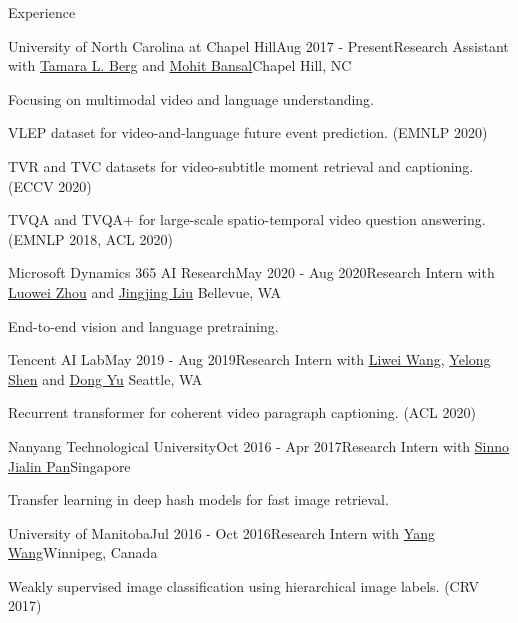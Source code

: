 \documentclass{resume} %
\begin{document}
\begin{rSection}{Experience}

\begin{rSubsection}{University of North Carolina at Chapel Hill}{Aug 2017 - Present}{Research Assistant with \href{http://www.tamaraberg.com/}{Tamara L. Berg} and \href{http://www.cs.unc.edu/~mbansal/}{Mohit Bansal}}{Chapel Hill, NC}
\item Focusing on multimodal video and language understanding.
\item VLEP dataset for video-and-language future event prediction. (EMNLP 2020)
\item TVR and TVC datasets for video-subtitle moment retrieval and captioning. (ECCV 2020)
\item TVQA and TVQA+ for large-scale spatio-temporal video question answering. (EMNLP 2018, ACL 2020)
\end{rSubsection}



\begin{rSubsection}{Microsoft Dynamics 365 AI Research}{May 2020 - Aug 2020}{Research Intern with 
    \href{https://luoweizhou.github.io/}{Luowei Zhou} and
    \href{https://www.linkedin.com/in/jingjing-liu-65703431/}{Jingjing Liu}} {Bellevue, WA}
    \item End-to-end vision and language pretraining.
    \end{rSubsection}



\begin{rSubsection}{Tencent AI Lab}{May 2019 - Aug 2019}{Research Intern with 
    \href{http://www.deepcv.net/}{Liwei Wang}, 
    \href{https://scholar.google.com/citations?hl=en&user=S6OFEFEAAAAJ}{Yelong Shen} 
    and \href{https://scholar.google.com/citations?user=tMY31_gAAAAJ&hl=en}{Dong Yu}} {Seattle, WA}
    \item Recurrent transformer for coherent video paragraph captioning. (ACL 2020)
    \end{rSubsection}


\begin{rSubsection}{Nanyang Technological University}{Oct 2016 - Apr 2017}{Research Intern with \href{https://personal.ntu.edu.sg/sinnopan/}{Sinno Jialin Pan}}{Singapore}
    \item Transfer learning in deep hash models for fast image retrieval.
    \end{rSubsection}


\begin{rSubsection}{University of Manitoba}{Jul 2016 - Oct 2016}{Research Intern with \href{https://www.cs.umanitoba.ca/~ywang/}{Yang Wang}}{Winnipeg, Canada}
    \item Weakly supervised image classification using hierarchical image labels. (CRV 2017)
    \end{rSubsection}

\end{rSection}
\end{document}
